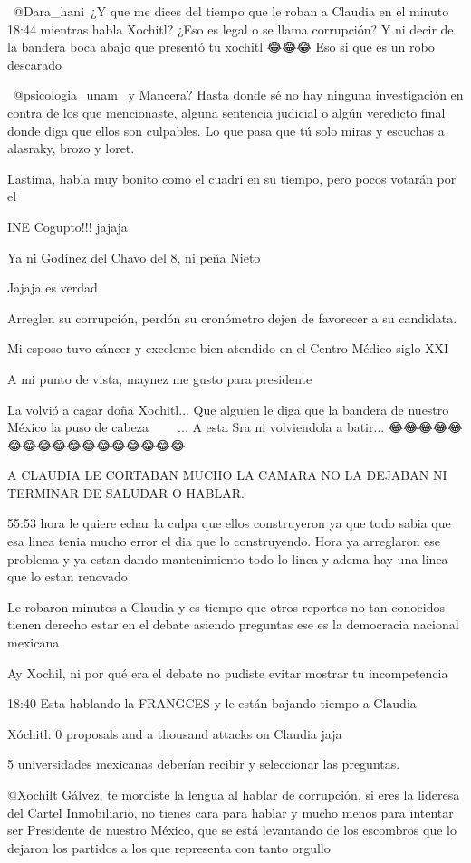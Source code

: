 ​​ @Dara_hani ¿Y que me dices del tiempo que le roban a Claudia en el minuto 18:44 mientras habla Xochitl? ¿Eso es legal o se llama corrupción? Y ni decir de la bandera boca abajo que presentó tu xochitl 😂😂😂 Eso si que es un robo descarado

 @psicologia_unam  y Mancera? Hasta donde sé no hay ninguna investigación en contra de los que mencionaste, alguna sentencia judicial o algún veredicto final donde diga que ellos son culpables. Lo que pasa que tú solo miras y escuchas a alasraky, brozo y loret.

Lastima, habla muy bonito como el cuadri en su tiempo, pero pocos votarán por el

INE Cogupto!!! jajaja

Ya ni Godínez del Chavo del 8, ni peña Nieto

Jajaja es verdad

Arreglen su corrupción, perdón su cronómetro dejen de favorecer a su candidata.

Mi esposo tuvo cáncer y excelente bien atendido en el Centro Médico siglo XXI

A mi punto de vista, maynez me gusto para presidente

La volvió a cagar doña Xochitl... Que alguien le diga que la bandera de nuestro México la puso de cabeza 🤣🤣🤣🤣🤣🤦🏻... A esta Sra ni volviendola a batir... 😂😂😂😂😂😂😂😂😂😂😂😂😂😂😂😂😂

A CLAUDIA LE CORTABAN MUCHO LA CAMARA NO LA DEJABAN NI TERMINAR DE SALUDAR O HABLAR.

55:53 hora le quiere echar la culpa que ellos construyeron ya que todo sabia que esa linea tenia mucho error el dia que lo construyendo.
Hora ya arreglaron ese problema y ya estan dando mantenimiento todo lo linea y adema hay una linea que lo estan renovado

Le robaron minutos a Claudia y es tiempo que otros reportes no tan conocidos tienen derecho estar en el debate asiendo preguntas ese es la democracia nacional mexicana

Ay Xochil, ni por qué era el debate no pudiste evitar mostrar tu incompetencia

18:40 Esta hablando la FRANGCES y le están bajando tiempo a Claudia

Xóchitl: 0 proposals and a thousand attacks on Claudia jaja

5 universidades mexicanas deberían recibir y seleccionar las preguntas.

@Xochilt Gálvez, te mordiste la lengua al hablar de corrupción, si eres la lideresa del Cartel Inmobiliario, no tienes cara para hablar y mucho menos para intentar ser Presidente de nuestro México, que se está levantando de los escombros que lo dejaron los partidos a los que representa con tanto orgullo 🤬

